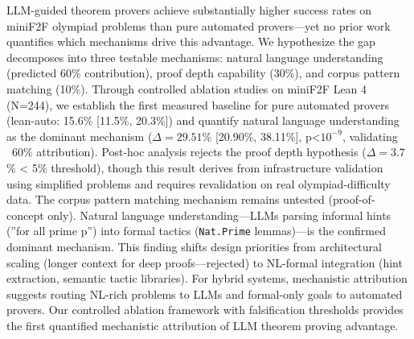
LLM-guided theorem provers achieve substantially higher success rates on miniF2F olympiad problems than pure automated provers---yet no prior work quantifies which mechanisms drive this advantage. We hypothesize the gap decomposes into three testable mechanisms: natural language understanding (predicted 60\% contribution), proof depth capability (30\%), and corpus pattern matching (10\%). Through controlled ablation studies on miniF2F Lean 4 (N=244), we establish the first measured baseline for pure automated provers (lean-auto: 15.6\% [11.5\%, 20.3\%]) and quantify natural language understanding as the dominant mechanism ($\Delta =29.51$\% [20.90\%, 38.11\%], p<$10^{-9}$, validating ~60\% attribution). Post-hoc analysis rejects the proof depth hypothesis ($\Delta =3.7$\% < 5\% threshold), though this result derives from infrastructure validation using simplified problems and requires revalidation on real olympiad-difficulty data. The corpus pattern matching mechanism remains untested (proof-of-concept only). Natural language understanding---LLMs parsing informal hints (''for all prime p'') into formal tactics (\texttt{Nat.Prime} lemmas)---is the confirmed dominant mechanism. This finding shifts design priorities from architectural scaling (longer context for deep proofs---rejected) to NL-formal integration (hint extraction, semantic tactic libraries). For hybrid systems, mechanistic attribution suggests routing NL-rich problems to LLMs and formal-only goals to automated provers. Our controlled ablation framework with falsification thresholds provides the first quantified mechanistic attribution of LLM theorem proving advantage.
